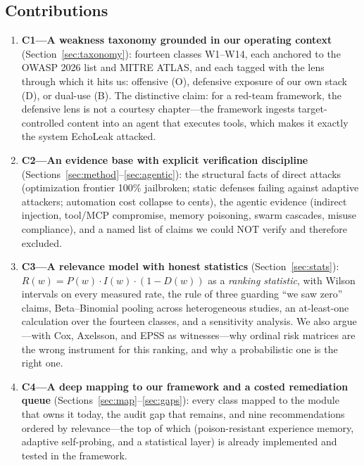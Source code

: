 \subsection{Contributions}\label{sec:contrib}

\begin{enumerate}[itemsep=2pt, topsep=4pt]
  \item \textbf{C1---A weakness taxonomy grounded in our operating context}
        (Section~\ref{sec:taxonomy}): fourteen classes W1--W14, each anchored to
        the OWASP 2026 list and MITRE ATLAS, and each tagged with the lens through
        which it hits us: offensive (O), defensive exposure of our own stack (D),
        or dual-use (B). The distinctive claim: for a red-team framework, the
        defensive lens is not a courtesy chapter---the framework ingests
        target-controlled content into an agent that executes tools, which makes it
        exactly the system EchoLeak attacked.
  \item \textbf{C2---An evidence base with explicit verification discipline}
        (Sections~\ref{sec:method}--\ref{sec:agentic}): the structural facts of
        direct attacks (optimization frontier 100\% jailbroken; static defenses
        failing against adaptive attackers; automation cost collapse to cents),
        the agentic evidence (indirect injection, tool/MCP compromise, memory
        poisoning, swarm cascades, misuse compliance), and a named list of claims
        we could NOT verify and therefore excluded.
  \item \textbf{C3---A relevance model with honest statistics}
        (Section~\ref{sec:stats}): $R(w) = P(w)\cdot I(w)\cdot(1-D(w))$ as a
        \emph{ranking statistic}, with Wilson intervals on every measured rate, the
        rule of three guarding ``we saw zero'' claims, Beta--Binomial pooling across
        heterogeneous studies, an at-least-one calculation over the fourteen
        classes, and a
        sensitivity analysis. We also argue---with Cox, Axelsson, and EPSS as
        witnesses---why ordinal risk matrices are the wrong instrument for this
        ranking, and why a probabilistic one is the right one.
  \item \textbf{C4---A deep mapping to our framework and a costed remediation
        queue} (Sections~\ref{sec:map}--\ref{sec:gaps}): every class mapped to the
        module that owns it today, the audit gap that remains, and nine
        recommendations ordered by relevance---the top of which (poison-resistant
        experience memory, adaptive self-probing, and a statistical layer) is
        already implemented and tested in the framework.
\end{enumerate}

